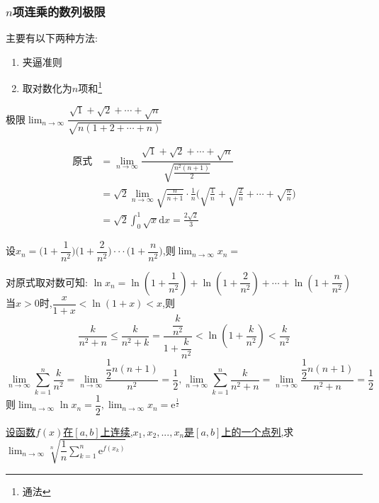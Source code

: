 \documentclass[8pt a4paper, oneside, UTF8]{ctexbook}
\begin{document}
\begin{sloppypar}
    \subsubsection{$n$项连乘的数列极限}
    主要有以下两种方法:
    \begin{enumerate}
        \item 夹逼准则
        \item 取对数化为$n$项和\footnote{通法}
    \end{enumerate}
    \begin{problem}
    极限$\lim_{n\to\infty}\dfrac{\sqrt{1}+\sqrt{2}+\cdots+\sqrt{n}}{\sqrt{n(1+2+\cdots+n)}}$
    \end{problem}
    \begin{solution}
        \begin{align*}
            \text{原式} & = \lim_{n\to\infty}\dfrac{\sqrt{1}+\sqrt{2}+\cdots+\sqrt{n}}{\sqrt{\frac{n^2(n+1)}2}}                                    \\
                      & = \sqrt{2}\lim_{n\to\infty}\sqrt{\frac n{n+1}}\cdot\frac1n\Big(\sqrt{\frac1n}+\sqrt{\frac2n}+\cdots+\sqrt{\frac nn}\Big) \\
                      & = \sqrt{2}\int_0^1\sqrt{x}\mathrm{d}x=\frac{2\sqrt{2}}{3}
        \end{align*}
    \end{solution}
    \begin{problem}
    设$x_n=\Bigg(1+\dfrac{1}{n^2}\Bigg)\Bigg(1+\dfrac{2}{n^2}\Bigg)\cdotp\cdotp\cdotp\Bigg(1+\dfrac{n}{n^2}\Bigg)$,则$\lim_{n\to\infty}x_n=$
    \end{problem}
    \begin{solution}
        对原式取对数可知:
        $\ln x_n=\ln(1+\dfrac{1}{n^2})+\ln(1+\dfrac{2}{n^2})+\cdots +\ln(1+\dfrac{n}{n^2})$
        当$x>0$时,$\dfrac x{1+x}<\ln(1+x)<x$,则
        $$
            \dfrac k{n^2+n}\leqslant\dfrac k{n^2+k}=\dfrac{\dfrac k{n^2}}{1+\dfrac k{n^2}}<\ln\left(1+\dfrac k{n^2}\right)<\dfrac k{n^2}
        $$
        $$
            \lim_{n\to\infty}\sum_{k=1}^n\dfrac k{n^2}=\lim_{n\to\infty}\dfrac{\dfrac12n(n+1)}{n^2}=\dfrac12,\lim_{n\to\infty}\sum_{k=1}^n\dfrac k{n^2+n}=\lim_{n\to\infty}\dfrac{\dfrac12n(n+1)}{n^2+n}=\dfrac12
        $$
        则$\lim_{n\to\infty}\ln x_{n} = \dfrac{1}{2},\lim_{n\to\infty}x_{n} = \mathrm{e}^{\frac{1}{2}}$
    \end{solution}
    \begin{problem}
    \uline{设函数$f(x)$在$[a,b]$上连续,$x_1,x_2,...,x_n$是$[a,b]$上的一个点列,}求$\lim_{n\to\infty}\sqrt[n]{\dfrac1n\sum_{k=1}^n\mathrm{e}^{f(x_k)}}$

\end{problem}
\end{sloppypar}
\end{document}
